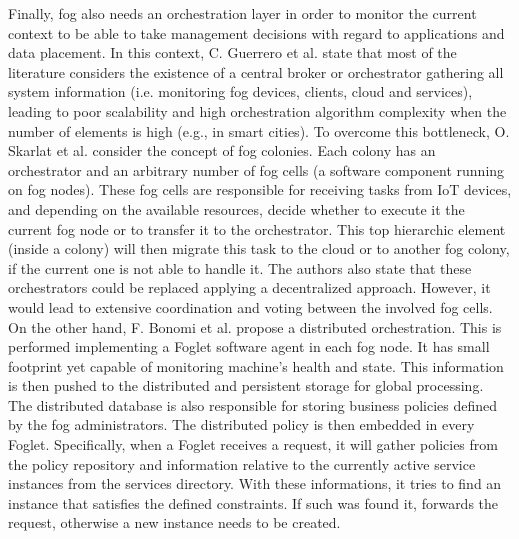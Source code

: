 \noindent\tab Finally, fog also needs an orchestration layer in order to monitor the current context to be able to take management decisions with regard to applications and data placement. In this context, C. Guerrero et al. \cite{guerrero2018influence} state that most of the literature considers the existence of a central broker or orchestrator gathering all system information (i.e. monitoring fog devices, clients, cloud and services), leading to poor scalability and high orchestration algorithm complexity when the number of elements is high (e.g., in smart cities). To overcome this bottleneck, O. Skarlat et al. \cite{skarlat2016resource,skarlat2017optimized} consider the concept of fog colonies. Each colony has an orchestrator and an arbitrary number of fog cells (a software component running on fog nodes). These fog cells are responsible for receiving tasks from IoT devices, and depending on the available resources, decide whether to execute it the current fog node or to transfer it to the orchestrator. This top hierarchic element (inside a colony) will then migrate this task to the cloud or to another fog colony, if the current one is not able to handle it. The authors also state that these orchestrators could be replaced applying a decentralized approach. However, it would lead to extensive coordination and voting between the involved fog cells. On the other hand, F. Bonomi et al. \cite{bonomi2014fog} propose a distributed orchestration. This is performed implementing a Foglet software agent in each fog node. It has small footprint yet capable of monitoring machine's health and state. This information is then pushed to the distributed and persistent storage for global processing. The distributed database is also responsible for storing business policies defined by the fog administrators. The distributed policy is then embedded in every Foglet. Specifically, when a Foglet receives a request, it will gather policies from the policy repository and information relative to the currently active service instances from the services directory. With these informations, it tries to find an instance that satisfies the defined constraints. If such was found it, forwards the request, otherwise a new instance needs to be created.\\
